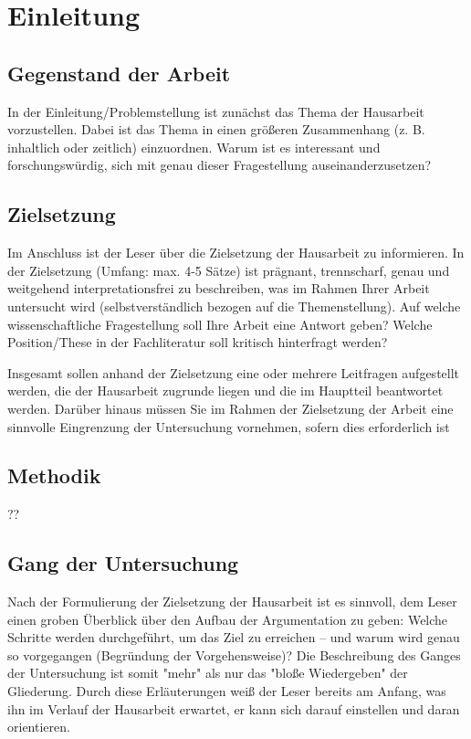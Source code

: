 \chapter{Einleitung}

\section{Gegenstand der Arbeit}

In der Einleitung/Problemstellung ist zunächst das Thema der Hausarbeit vorzustellen. Dabei ist das Thema in einen größeren Zusammenhang (z. B. inhaltlich oder zeitlich) einzuordnen. Warum ist es interessant und forschungswürdig, sich mit genau dieser Fragestellung auseinanderzusetzen?

\section{Zielsetzung}

Im Anschluss ist der Leser über die Zielsetzung der Hausarbeit zu informieren. In der Zielsetzung (Umfang: max. 4-5 Sätze) ist prägnant, trennscharf, genau und weitgehend interpretationsfrei zu beschreiben, was im Rahmen Ihrer Arbeit untersucht wird (selbstverständlich bezogen auf die Themenstellung).
Auf welche wissenschaftliche Fragestellung soll Ihre Arbeit eine Antwort geben? Welche Position/These in der Fachliteratur soll kritisch hinterfragt werden?

Insgesamt sollen anhand der Zielsetzung eine oder mehrere Leitfragen aufgestellt werden, die der Hausarbeit zugrunde liegen und die im Hauptteil beantwortet werden.
Darüber hinaus müssen Sie im Rahmen der Zielsetzung der Arbeit eine sinnvolle Eingrenzung der Untersuchung vornehmen, sofern dies erforderlich ist

\section{Methodik}

??

\section{Gang der Untersuchung}

Nach der Formulierung der Zielsetzung der Hausarbeit ist es sinnvoll, dem Leser einen groben Überblick über den Aufbau der Argumentation zu geben: Welche Schritte werden durchgeführt, um das Ziel zu erreichen – und warum wird genau so vorgegangen (Begründung der Vorgehensweise)? Die Beschreibung des Ganges der Untersuchung ist somit "mehr" als nur das "bloße Wiedergeben" der Gliederung. Durch diese Erläuterungen weiß der Leser bereits am Anfang, was ihn im Verlauf der Hausarbeit erwartet, er kann sich darauf einstellen und daran orientieren.


